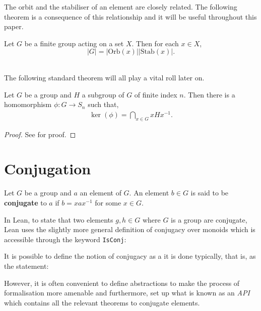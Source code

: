 The orbit and the stabiliser of an element are closely related. 
The following theorem is a consequence of this relationship and it will be useful throughout this paper. \\

\begin{theorem}
    Let $G$ be a finite group acting on a set $X$. Then for each $x \in X$, $$|G| = |\textrm{Orb}(x)| |\textrm{Stab}(x)|.$$ \\
\end{theorem}

The following standard theorem will all play a vital roll later on.

\begin{theorem}
    \label{symhomoker}
     Let $G$ be a group and $H$ a subgroup of $G$ of finite index $n$. Then there is a homomorphism $\phi : G \longrightarrow S_n$ such that,
\begin{align*} \ker(\phi) = \bigcap\limits_{x \in G} x H x^{-1}.
\end{align*}
\end{theorem}

\begin{proof} 
    See \cite[p.110]{bhattacharya} for proof.
\end{proof}

\section{Conjugation}

\begin{definition}
Let $G$ be a group and $a$ an element of $G$. An element $b \in G$ is said to be \textbf{conjugate} to $a$ if $b=xax^{-1}$ for some $x \in G$. \\
\end{definition}

\begin{remark}
\label{conj_elem}
In Lean, to state that two elements $g, h \in G$ where $G$ is a group are conjugate, 
Lean uses the slightly more general definition of conjugacy over monoids which is accessible through
the keyword \texttt{IsConj}:



It is possible to define the notion of conjugacy as a it is done typically, that is, as the statement:



However, it is often convenient to define abstractions to make the process of formalisation more amenable and furthermore,
set up what is known as an \textit{API} which contains all the relevant theorems to conjugate elements.

\end{remark}


